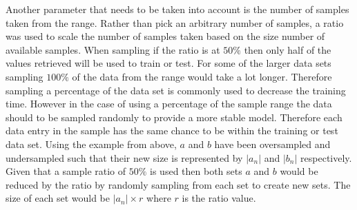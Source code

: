 Another parameter that needs to be taken into account is the number of samples taken from the range. Rather than pick an arbitrary number of samples, a ratio was used to scale the number of samples taken based on the size number of available samples. When sampling if the ratio is at $50\%$ then only half of the values retrieved will be used to train or test. For some of the larger data sets sampling $100\%$ of the data from the range would take a lot longer. Therefore sampling a percentage of the data set is commonly used to decrease the training time. However in the case of using a percentage of the sample range the data should to be sampled randomly to provide a more stable model. Therefore each data entry in the sample has the same chance to be within the training or test data set. Using the example from above, $a$ and $b$ have been oversampled and undersampled such that their new size is represented by $|a_n|$ and $|b_n|$ respectively. Given that a sample ratio of $50\%$ is used then both sets $a$ and $b$ would be reduced by the ratio by randomly sampling from each set to create new sets. The size of each set would be $|a_n| \times r$ where $r$ is the ratio value.

